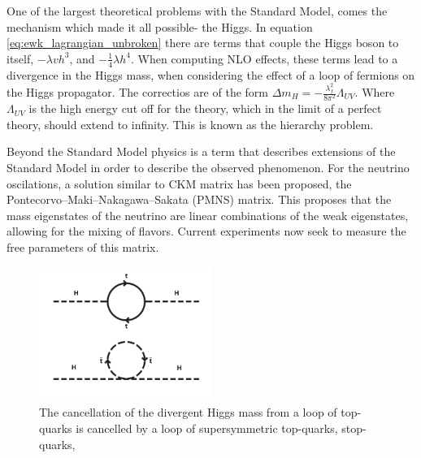 \par One of the largest theoretical problems with the Standard Model,
comes the mechanism which made it all possible- the Higgs.  In
equation \ref{eq:ewk_lagrangian_unbroken} there are terms that couple
the Higgs boson to itself, $-{\lambda}vh^{3}$, and
$-\frac{1}{4}{\lambda}h^{4}$.  When computing NLO effects, these terms
lead to a divergence in the Higgs mass, when considering the effect of
a loop of fermions on the Higgs propagator.  The correctios are of the form ${\Delta}m_{H} =
-\frac{\lambda_{f}^{2}}{8\pi^{2}}\Lambda_{UV}$.  Where $\Lambda_{UV}$
is the high energy cut off for the theory, which in the limit of a
perfect theory, should extend to infinity.  This is known as the
hierarchy problem.  

\par Beyond the Standard Model physics is a term that describes
extensions of the Standard Model in order to describe the observed
phenomenon.  For the neutrino oscilations, a solution similar to CKM
matrix has been proposed, the Pontecorvo–Maki–Nakagawa–Sakata (PMNS)
matrix.  This proposes that the mass eigenstates of the neutrino are
linear combinations of the weak eigenstates, allowing for the mixing
of flavors.  Current experiments now seek to measure the free
parameters of this matrix.  

\begin{figure}[h]
   \centering
  \includegraphics[width=0.5\textwidth]{Figures/Basic_Diagrams/hierarchy_problem_susy_solution.png}
  \caption{The cancellation of the divergent Higgs mass from a loop of
  top-quarks is cancelled by a loop of supersymmetric top-quarks,
  stop-quarks,} \label{fig:hierarchy_problem}
\end{figure}

